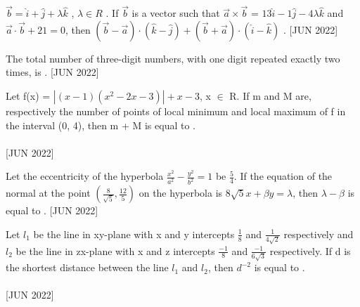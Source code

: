     \item $\overset{\rightarrow}{b} = \hat{i} + \hat{j} + \lambda\hat{k}$ , $\lambda \in R$ . If $\overset{\rightarrow}{b}$ is a vector such that $\overset{\rightarrow}{a} \times \overset{\rightarrow}{b}$ = $13\hat{i} - 1\hat{j} - 4\lambda\hat{k}$ and $\overset{\rightarrow}{a} \cdot \overset{\rightarrow}{b} + 21 = 0$, then $(\overset{\rightarrow}{b} - \overset{\rightarrow}{a}) \cdot (\hat{k} - \hat{j}) + (\overset{\rightarrow}{b} + \overset{\rightarrow}{a}) \cdot (\hat{i} - \hat{k})$ \underline{\hspace{1cm}}. \hfill{[JUN 2022]}
    \bigskip
    
    \item The total number of three-digit numbers, with one digit repeated exactly two times, is \underline{\hspace{1cm}}. \hfill{[JUN 2022]}
    \bigskip
    
    \item Let f(x) = $|(x - 1)(x^2 - 2x - 3)| + x - 3$, x $\in$ R. If m and M are, respectively the number of points of local minimum and local maximum of f in the interval (0, 4), then m + M is equal to \underline{\hspace{1cm}}. \\\\\hfill{[JUN 2022]}
    \bigskip
    
    \item Let the eccentricity of the hyperbola $\frac{x^2}{a^2} - \frac{y^2}{b^2} = 1$ be $\frac{5}{4}$. If the equation of the normal at the point $(\frac{8}{\sqrt{5}},\frac{12}{5})$ on the hyperbola is $8\sqrt{5}x + \beta y = \lambda$, then $\lambda - \beta$ is equal to \underline{\hspace{1cm}}. \hfill{[JUN 2022]}
    \bigskip
    
    \item Let $l_1$ be the line in xy-plane with x and y intercepts $\frac{1}{8}$ and $\frac{1}{4\sqrt{2}}$ respectively and $l_2$ be the line in zx-plane with x and z intercepts $\frac{-1}{8}$ and $\frac{-1}{6\sqrt{3}}$ respectively. If d is the shortest distance between the line $l_1$ and $l_2$, then $d^{-2}$ is equal to \underline{\hspace{1cm}}. \\\\\hfill{[JUN 2022]}
